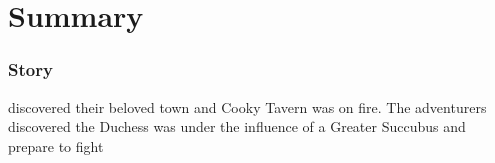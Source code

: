 \part*{Summary}
\section{Story}
 discovered their beloved town and Cooky Tavern was on fire. The adventurers discovered the Duchess was under the influence of a Greater Succubus and prepare to fight
